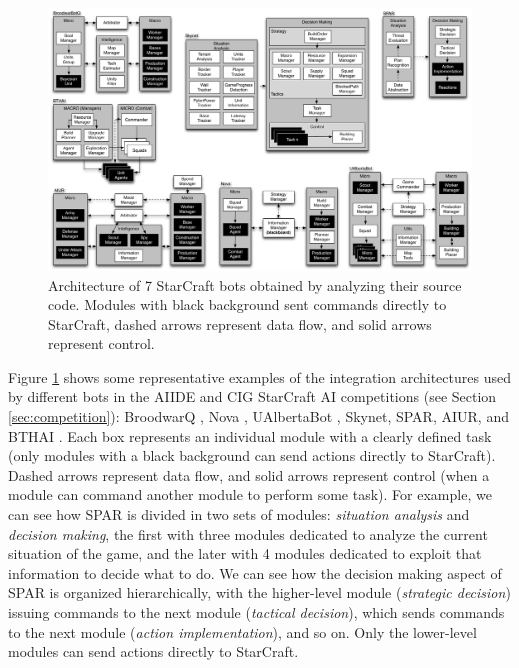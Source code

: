 \documentclass[journal]{IEEEtran}
\begin{document}
\begin{figure}[ta]
    \centering
    \includegraphics[width=\textwidth]{figures/figure-bot-architectures-wide.pdf}
    \caption{Architecture of 7 StarCraft bots obtained by analyzing their source code. Modules with black background sent commands directly to StarCraft, dashed arrows represent data flow, and solid arrows represent control.}
    \label{fig:bot-architecture}
\end{figure}

Figure \ref{fig:bot-architecture} shows some representative examples of the integration architectures used by different bots in the AIIDE and CIG StarCraft AI competitions (see Section \ref{sec:competition}): BroodwarQ \cite{SynnaeveMicroCig11}, Nova \cite{uriarte2012kiting}, UAlbertaBot \cite{churchill2011build}, Skynet, SPAR, AIUR, and BTHAI \cite{Hagelback12}. Each box represents an individual module with a clearly defined task (only modules with a black background can send actions directly to StarCraft). Dashed arrows represent data flow, and solid arrows represent control (when a module can command another module to perform some task). For example, we can see how SPAR is divided in two sets of modules: {\em situation analysis} and {\em decision making}, the first with three modules dedicated to analyze the current situation of the game, and the later with 4 modules dedicated to exploit that information to decide what to do. We can see how the decision making aspect of SPAR is organized hierarchically, with the higher-level module ({\em strategic decision}) issuing commands to the next module ({\em tactical decision}), which sends commands to the next module ({\em action implementation}), and so on. Only the lower-level modules can send actions directly to StarCraft. 
\end{document}
